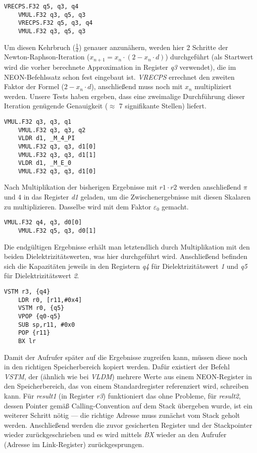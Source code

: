 \documentclass[11pt]{scrartcl}
\begin{document}
\begin{lstlisting}[language={[x86masm]Assembler}]
	VRECPS.F32 q5, q3, q4
	VMUL.F32 q3, q5, q3
	VRECPS.F32 q5, q3, q4
	VMUL.F32 q3, q5, q3
\end{lstlisting}
Um diesen Kehrbruch ($\frac{1}{d}$) genauer anzunähern, werden hier 2 Schritte der Newton-Raphson-Iteration ($x_{n+1}=x_{n} \cdot (2 - x_{n} \cdot d)$) durchgeführt (als Startwert wird die vorher berechnete Approximation in Register \emph{q3} verwendet), die im NEON-Befehlssatz schon fest eingebaut ist. \emph{VRECPS} errechnet den zweiten Faktor der Formel ($2 - x_{n} \cdot d$), anschließend muss noch mit $x_{n}$ multipliziert werden. Unsere Tests haben ergeben, dass eine zweimalige Durchführung dieser Iteration genügende Genauigkeit ($\approx$ 7 signifikante Stellen) liefert.
\\
\begin{lstlisting}[language={[x86masm]Assembler}]
	VMUL.F32 q3, q3, q1
	VMUL.F32 q3, q3, q2
	VLDR d1, _M_4_PI
	VMUL.F32 q3, q3, d1[0]
	VMUL.F32 q3, q3, d1[1]
	VLDR d1, _M_E_0
	VMUL.F32 q3, q3, d1[0]
\end{lstlisting}
Nach Multiplikation der bisherigen Ergebnisse mit $r1 \cdot r2$ werden anschließend $\pi$ und $4$ in das Register \emph{d1} geladen, um die Zwischenergebnisse mit diesen Skalaren zu multiplizieren. Dasselbe wird mit dem Faktor $\varepsilon_{0}$ gemacht.
\\
\begin{lstlisting}[language={[x86masm]Assembler}]
	VMUL.F32 q4, q3, d0[0]
	VMUL.F32 q5, q3, d0[1]
\end{lstlisting}
Die endgültigen Ergebnisse erhält man letztendlich durch Multiplikation mit den beiden Dielektrizitätswerten, was hier durchgeführt wird. Anschließend befinden sich die Kapazitäten jeweils in den Registern \emph{q4} für Dielektrizitätswert \emph{1} und \emph{q5} für Dielektrizitätswert \emph{2}.
\\
\begin{lstlisting}[language={[x86masm]Assembler}]
	VSTM r3, {q4}
	LDR r0, [r11,#0x4]
	VSTM r0, {q5}
	VPOP {q0-q5}
	SUB sp,r11, #0x0
	POP {r11}
	BX lr
\end{lstlisting}
Damit der Aufrufer später auf die Ergebnisse zugreifen kann, müssen diese noch in den richtigen Speicherbereich kopiert werden. Dafür existiert der Befehl \emph{VSTM}, der (ähnlich wie bei \emph{VLDM}) mehrere Werte aus einem NEON-Register in den Speicherbereich, das von einem Standardregister referenziert wird, schreiben kann. Für \emph{result1} (in Register \emph{r3}) funktioniert das ohne Probleme, für \emph{result2}, dessen Pointer gemäß Calling-Convention auf dem Stack übergeben wurde, ist ein weiterer Schritt nötig --- die richtige Adresse muss zunächst vom Stack geholt werden. Anschließend werden die zuvor gesicherten Register und der Stackpointer wieder zurückgeschrieben und es wird mittels \emph{BX} wieder an den Aufrufer (Adresse im Link-Register) zurückgesprungen.
\end{document}

